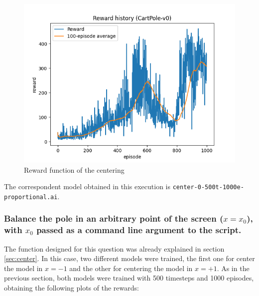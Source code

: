 \documentclass[12pt]{article}
\begin{document}
\begin{figure}[h]
    \centering
    \includegraphics[scale=0.45]{exercise-1/report/img/rewards/center-0-500t-1000e-proportion.png}
    \caption{Reward function of the centering}
    \label{fig:rewards-1}
\end{figure}

The correspondent model obtained in this execution is \texttt{center-0-500t-1000e-proportional.ai}.

\subsubsection{Balance the pole in an arbitrary point of the screen ($x = x_0$), with $x_0$ passed as a command line argument
to the script.}
\label{sec:center-point}

The function designed for this question was already explained in section \ref{sec:center}. In this case, two different models were trained, the first one for center the model in $x = -1$ and the other for centering the model in $x=+1$. As in the previous section, both models were trained with 500 timesteps and 1000 episodes, obtaining the following plots of the rewards:
\end{document}
